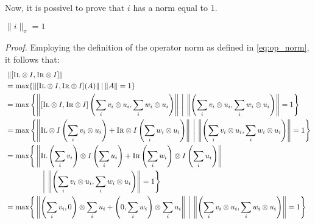 Now, it is possivel to prove that $i$ has a norm equal to 1.

\begin{lemma} \label{lem3}
  $  \lVert i\rVert_{\sigma} = 1 $
\end{lemma}

\vspace{10pt}

\textit{Proof.} \quad Employing the definition of the operator norm as defined in \autoref{eq:op_norm}, it follows that:
\begin{equation}
  \begin{split}
      & \hspace{3pt} \lVert [\textsc{Il} \otimes I, \textsc{Ir} \otimes I ]  \rVert_{}  \\
      &= \text{max} \{ \lVert [\textsc{Il} \otimes I, \textsc{Ir} \otimes I ] (A) \rVert \hspace{2pt} \vert \hspace{2pt}  \lVert A\rVert =1   \} \\
      &= \text{max} \left\{ \left\lVert [\textsc{Il} \otimes I, \textsc{Ir} \otimes I ] \left(\sum_{i} v_i \otimes u_i,\sum_{i} w_i \otimes u_i  \right) \right\rVert \hspace{2pt} \Bigg\vert \hspace{2pt}  \left\lVert \left(\sum_{i} v_i \otimes u_i,\sum_{i} w_i \otimes u_i  \right) \right\rVert =1    \right\} \\
      & =\text{max} \left\{ \left\lVert \textsc{Il} \otimes I \left(\sum_{i} v_i \otimes u_i  \right)  +  \textsc{Ir} \otimes I \left(\sum_{i} w_i \otimes u_i  \right) \right\rVert \hspace{2pt} \Bigg\vert \hspace{2pt}  \left\lVert \left(\sum_{i} v_i \otimes u_i,\sum_{i} w_i \otimes u_i  \right) \right\rVert =1    \right\} \\
      & = \text{max} \Bigg\{ \left\lVert \textsc{Il} \left(\sum_{i} v_i  \right) \otimes I \left(\sum_{i} u_i  \right) + \textsc{Ir} \left(\sum_{i} w_i \right)\otimes I \left(\sum_{i} u_i  \right) \right\rVert \hspace{2pt} \\
      & \hspace{50pt}\Bigg\vert \hspace{2pt}  \left\lVert \left(\sum_{i} v_i \otimes u_i,\sum_{i} w_i \otimes u_i  \right) \right\rVert =1    \Bigg\} \\
      &= \text{max} \Bigg\{ \left\lVert \left(\sum_{i} v_i,0  \right) \otimes \sum_{i} u_i +  \left(0,\sum_{i} w_i \right) \otimes \sum_{i} u_i   \right\rVert  \hspace{2pt} \Bigg\vert \hspace{2pt}  \left\lVert \left(\sum_{i} v_i \otimes u_i,\sum_{i} w_i \otimes u_i  \right) \right\rVert =1    \Bigg\} \\

\end{split}
\end{equation}
